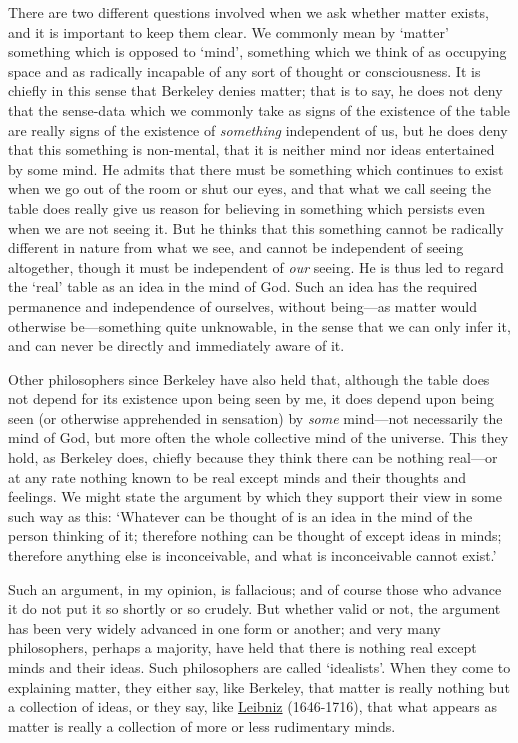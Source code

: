 \documentclass[oneside,letterpaper,12pt]{book}
\begin{document}
There are two different questions involved when we ask whether matter
exists, and it is important to keep them clear. We commonly mean by
`matter' something which is opposed to
`mind', something which we think of as
occupying space and as radically incapable of any sort of thought or
consciousness. It is chiefly in this sense that Berkeley denies matter;
that is to say, he does not deny that the sense-data which we commonly
take as signs of the existence of the table are really signs of the
existence of \emph{something} independent of us, but he does deny that
this something is non-mental, that it is neither mind nor ideas
entertained by some mind. He admits that there must be something which
continues to exist when we go out of the room or shut our eyes, and that
what we call seeing the table does really give us reason for believing
in something which persists even when we are not seeing it. But he
thinks that this something cannot be radically different in nature from
what we see, and cannot be independent of seeing altogether, though it
must be independent of \emph{our} seeing. He is thus led to regard the
`real' table as an idea in the mind of
God. Such an idea has the required permanence and independence of
ourselves, without being---as matter would otherwise be---something
quite unknowable, in the sense that we can only infer it, and can never
be directly and immediately aware of it.

Other philosophers since Berkeley have also held that, although the
table does not depend for its existence upon being seen by me, it does
depend upon being seen (or otherwise apprehended in sensation) by
\emph{some} mind---not necessarily the mind of God, but more often the
whole collective mind of the universe. This they hold, as Berkeley does,
chiefly because they think there can be nothing real---or at any rate
nothing known to be real except minds and their thoughts and feelings.
We might state the argument by which they support their view in some
such way as this: `Whatever can be thought of is an idea
in the mind of the person thinking of it; therefore nothing can be
thought of except ideas in minds; therefore anything else is
inconceivable, and what is inconceivable cannot exist.'

Such an argument, in my opinion, is fallacious; and of course those who
advance it do not put it so shortly or so crudely. But whether valid or
not, the argument has been very widely advanced in one form or another;
and very many philosophers, perhaps a majority, have held that there is
nothing real except minds and their ideas. Such philosophers are called
`idealists'. When they come to explaining
matter, they either say, like Berkeley, that matter is really nothing
but a collection of ideas, or they say, like 
\href{https://plato.stanford.edu/entries/leibniz/}{Leibniz} (1646-1716), that
what appears as matter is really a collection of more or less
rudimentary minds.
\end{document}
